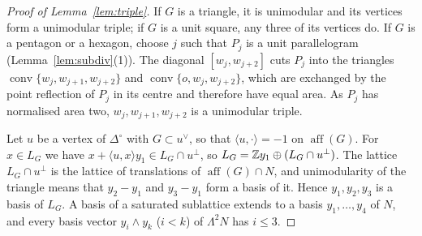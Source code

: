 \begin{proof}[Proof of Lemma~\ref{lem:triple}]
If $G$ is a triangle, it is unimodular and its vertices form a unimodular triple; if $G$ is a unit square, any three of
its vertices do. If $G$ is a pentagon or a hexagon, choose $j$ such that $P_j$ is a unit parallelogram
(Lemma~\ref{lem:subdiv}(1)). The diagonal $[w_j,w_{j+2}]$ cuts $P_j$ into the triangles $\operatorname{conv}\{w_j,w_{j+1},w_{j+2}\}$
and $\operatorname{conv}\{o,w_j,w_{j+2}\}$, which are exchanged by the point reflection of $P_j$ in its centre and
therefore have equal area. As $P_j$ has normalised area two, $w_j,w_{j+1},w_{j+2}$ is a unimodular triple.

Let $u$ be a vertex of $\Delta^\circ$ with $G\subset u^\vee$, so that $\langle u,\cdot\rangle=-1$ on $\operatorname{aff}(G)$. For
$x\in L_G$ we have $x+\langle u,x\rangle y_1\in L_G\cap u^\perp$, so $L_G=\mathbb Z y_1\oplus(L_G\cap u^\perp)$. The lattice
$L_G\cap u^\perp$ is the lattice of translations of $\operatorname{aff}(G)\cap N$, and unimodularity of the triangle means that
$y_2-y_1$ and $y_3-y_1$ form a basis of it. Hence $y_1,y_2,y_3$ is a basis of $L_G$. A basis of a saturated sublattice
extends to a basis $y_1,\dots,y_4$ of $N$, and every basis vector $y_i\wedge y_k$ ($i<k$) of $\Lambda^2N$ has $i\le3$.
\end{proof}


